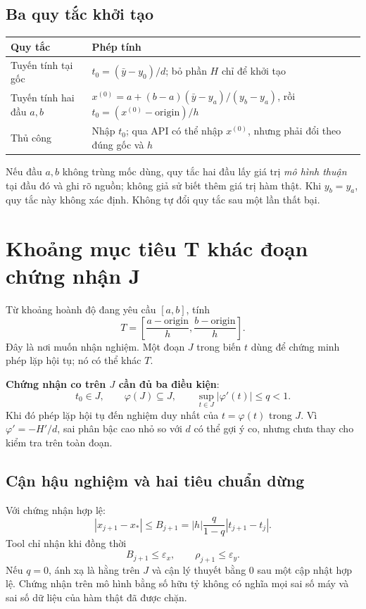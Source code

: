 \subsection{Ba quy tắc khởi tạo}
\begin{center}\small
\begin{tabular}{@{}p{.24\linewidth}p{.65\linewidth}@{}}\toprule
Quy tắc & Phép tính\\\midrule
Tuyến tính tại gốc & $t_0=(\bar y-y_0)/d$; bỏ phần $H$ chỉ để khởi tạo\\
Tuyến tính hai đầu $a,b$ & $x^{(0)}=a+(b-a)(\bar y-y_a)/(y_b-y_a)$, rồi $t_0=(x^{(0)}-\mathrm{origin})/h$\\
Thủ công & Nhập $t_0$; qua API có thể nhập $x^{(0)}$, nhưng phải đổi theo đúng gốc và $h$\\\bottomrule
\end{tabular}\end{center}
Nếu đầu $a,b$ không trùng mốc dùng, quy tắc hai đầu lấy giá trị \emph{mô hình thuận} tại đầu đó và ghi rõ nguồn; không giả sử biết thêm giá trị hàm thật. Khi $y_b=y_a$, quy tắc này không xác định. Không tự đổi quy tắc sau một lần thất bại.

\section{Khoảng mục tiêu T khác đoạn chứng nhận J}
\label{sec:inverse-contraction}
Từ khoảng hoành độ đang yêu cầu $[a,b]$, tính
\[
 T=\left[\frac{a-\mathrm{origin}}h,\frac{b-\mathrm{origin}}h\right].
\]
Đây là nơi muốn nhận nghiệm. Một đoạn $J$ trong biến $t$ dùng để chứng minh phép lặp hội tụ; nó có thể khác $T$.

\textbf{Chứng nhận co trên $J$ cần đủ ba điều kiện}:
\[
 t_0\in J,\qquad \varphi(J)\subseteq J,\qquad
 \sup_{t\in J}|\varphi'(t)|\le q<1.
\]
Khi đó phép lặp hội tụ đến nghiệm duy nhất của $t=\varphi(t)$ trong $J$. Vì $\varphi'=-H'/d$, sai phân bậc cao nhỏ so với $d$ có thể gợi ý co, nhưng chưa thay cho kiểm tra trên toàn đoạn.

\subsection{Cận hậu nghiệm và hai tiêu chuẩn dừng}
Với chứng nhận hợp lệ:
\[
 |x_{j+1}-x_*|\le B_{j+1}
 =|h|\frac q{1-q}|t_{j+1}-t_j|.
\]
Tool chỉ nhận khi đồng thời
\[
 B_{j+1}\le\varepsilon_x,\qquad
 \rho_{j+1}\le\varepsilon_y.
\]
Nếu $q=0$, ánh xạ là hằng trên $J$ và cận lý thuyết bằng 0 sau một cập nhật hợp lệ. Chứng nhận trên mô hình bằng số hữu tỷ không có nghĩa mọi sai số máy và sai số dữ liệu của hàm thật đã được chặn.

